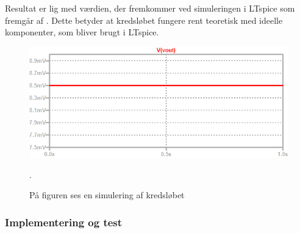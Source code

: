 Resultat er lig med værdien, der fremkommer ved simuleringen i LTspice som fremgår af . Dette betyder at kredsløbet fungere rent teoretisk med ideelle komponenter, som bliver brugt i LTspice.  
\begin{figure}[H]
\centering
\includegraphics[scale=1]{figures/cProblemloesning/Offset_simulering.png}
\caption{På figuren ses en simulering af kredsløbet}. 
\label{fig:Offset_simulering}
\end{figure}

\subsubsection{Implementering og test}